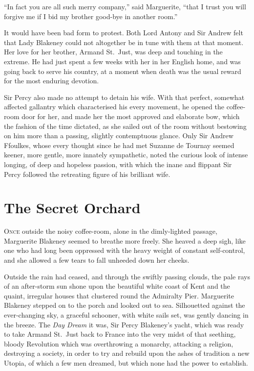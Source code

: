 \documentclass[paper=5.5in:8.5in,BCOR=7mm,twoside,DIV=calc,12pt,usegeometry,chapterprefix,endperiod,headings=big]{scrbook}
\begin{document}
\enquote{In fact you are all such merry company,} said Marguerite, \enquote{that I trust you will forgive me if I bid my brother good-bye in another room.}

It would have been bad form to protest. Both Lord Antony and Sir Andrew felt that Lady Blakeney could not altogether be in tune with them at that moment. Her love for her brother, Armand St.~Just, was deep and touching in the extreme. He had just spent a few weeks with her in her English home, and was going back to serve his country, at a moment when death was the usual reward for the most enduring devotion.

Sir Percy also made no attempt to detain his wife. With that perfect, somewhat affected gallantry which characterised his every movement, he opened the coffee-room door for her, and made her the most approved and elaborate bow, which the fashion of the time dictated, as she sailed out of the room without bestowing on him more than a passing, slightly contemptuous glance. Only Sir Andrew Ffoulkes, whose every thought since he had met Suzanne de Tournay seemed keener, more gentle, more innately sympathetic, noted the curious look of intense longing, of deep and hopeless passion, with which the inane and flippant Sir Percy followed the retreating figure of his brilliant wife.

\chapter{The Secret Orchard}
\lettrine[lines=4]{O}{nce} outside the noisy coffee-room, alone in the dimly-lighted passage, Marguerite Blakeney \newline seemed to breathe more freely. She heaved a deep sigh, like one who had long been oppressed with the heavy weight of constant self-control, and she allowed a few tears to fall unheeded down her cheeks.

Outside the rain had ceased, and through the swiftly passing clouds, the pale rays of an after-storm sun shone upon the beautiful white coast of Kent and the quaint, irregular houses that clustered round the Admiralty Pier. Marguerite Blakeney stepped on to the porch and looked out to sea. Silhouetted against the ever-changing sky, a graceful schooner, with white sails set, was gently dancing in the breeze. The \textit{Day Dream} it was, Sir Percy Blakeney's yacht, which was ready to take Armand St.~Just back to France into the very midst of that seething, bloody Revolution which was overthrowing a monarchy, attacking a religion, destroying a society, in order to try and rebuild upon the ashes of tradition a new Utopia, of which a few men dreamed, but which none had the power to establish.
\end{document}
